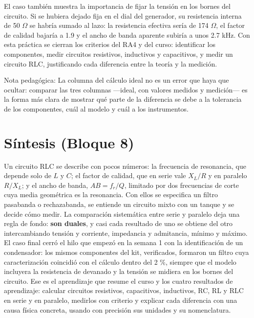 \documentclass[11pt,letterpaper]{article}
\begin{document}
El caso también muestra la importancia de fijar la tensión en los bornes del circuito. Si se hubiera dejado fija en el dial del generador, su resistencia interna de 50 \ensuremath{\Omega} se habría sumado al lazo: la resistencia efectiva sería de 174 \ensuremath{\Omega}, el factor de calidad bajaría a 1.9 y el ancho de banda aparente subiría a unos 2.7 kHz. Con esta práctica se cierran los criterios del RA4 y del curso: identificar los componentes, medir circuitos resistivos, inductivos y capacitivos, y medir un circuito RLC, justificando cada diferencia entre la teoría y la medición.

\begin{nota}{Nota pedagógica:}
La columna del cálculo ideal no es un error que haya que ocultar: comparar las tres columnas ---ideal, con valores medidos y medición--- es la forma más clara de mostrar qué parte de la diferencia se debe a la tolerancia de los componentes, cuál al modelo y cuál a los instrumentos.
\end{nota}

\section{Síntesis (Bloque 8)}

Un circuito RLC se describe con pocos números: la frecuencia de resonancia, que depende solo de $L$ y $C$; el factor de calidad, que en serie vale $X_L/R$ y en paralelo $R/X_L$; y el ancho de banda, $AB = f_r/Q$, limitado por dos frecuencias de corte cuya media geométrica es la resonancia. Con ellos se especifica un filtro pasabanda o rechazabanda, se entiende un circuito mixto con un tanque y se decide cómo medir. La comparación sistemática entre serie y paralelo deja una regla de fondo: \textbf{son duales}, y casi cada resultado de uno se obtiene del otro intercambiando tensión y corriente, impedancia y admitancia, mínimo y máximo. El caso final cerró el hilo que empezó en la semana 1 con la identificación de un condensador: los mismos componentes del kit, verificados, formaron un filtro cuya caracterización coincidió con el cálculo dentro del 2 \%, siempre que el modelo incluyera la resistencia de devanado y la tensión se midiera en los bornes del circuito. Ese es el aprendizaje que resume el curso y los cuatro resultados de aprendizaje: calcular circuitos resistivos, capacitivos, inductivos, RC, RL y RLC en serie y en paralelo, medirlos con criterio y explicar cada diferencia con una causa física concreta, usando con precisión sus unidades y su nomenclatura.
\end{document}

